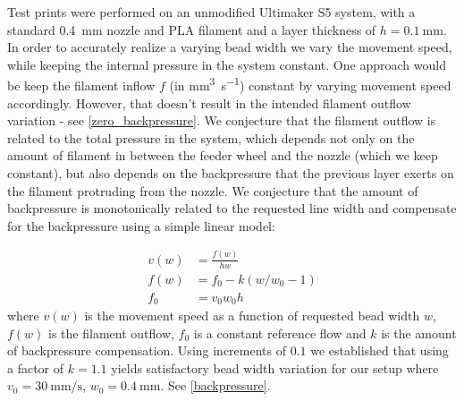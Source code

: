 Test prints were performed on an unmodified Ultimaker S5 system,
with a standard  \SI{0.4}{\milli\meter} nozzle
and PLA filament
and a layer thickness of $h=\SI{0.1}{\milli\meter}$.
In order to accurately realize a varying bead width we vary the movement speed, while keeping the internal pressure in the system constant.
One approach would be keep the filament inflow $f$ (in \si{\milli\meter\cubed\per\second}) constant by varying movement speed accordingly.
However, that doesn't result in the intended filament outflow variation - see \cref{zero_backpressure}.
We conjecture that the filament outflow is related to the total pressure in the system,
which depends not only on the amount of filament in between the feeder wheel and the nozzle (which we keep constant), 
but also depends on the backpressure that the previous layer exerts on the filament protruding from the nozzle.
We conjecture that the amount of backpressure is monotonically related to the requested line width and compensate for the backpressure using a simple linear model:

\begin{align}
 v(w) &= \frac{f(w)}{h w} \\ 
 f(w) &= f_0 - k \left( w / w_0 - 1 \right) \\
 f_0 &= v_0 w_0 h 
\end{align}
where
$v(w)$ is the movement speed as a function of requested bead width $w$,
$f(w)$ is the filament outflow,
$f_0$ is a constant reference flow
and
$k$ is the amount of backpressure compensation.
Using increments of $0.1$ we established that using a factor of $k=1.1$ yields satisfactory bead width variation for our setup where
$v_0=\SI{30}{\milli\meter\per\second}$, 
$w_0=\SI{0.4}{\milli\meter}$.
See \cref{backpressure}.

